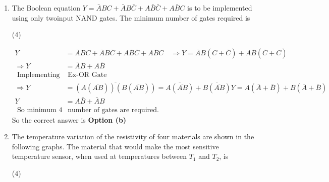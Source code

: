 \begin{enumerate}
If $Q_{1}, Q_{2}$ and $Q_{3}$ are set to zero initially, then the output after the arrival of the second falling clock (CLK) edge is
 \begin{tasks}(4)
\end{tasks}
\begin{answer}
	\begin{align*}
	\begin{array}{|ccc|c}
	\cline{1-3} Q_{3} & Q_{3} & Q_{1}& \\
	\cline{1-3} 0 & 0 & 1 &(1)\\
	\cline{1-3} 0 & 1 & 1 &(2)\\
	\cline{1-3}
	\end{array}
	\end{align*}
	So the correct answer is \textbf{Option (c)}
\end{answer}
\item The Boolean equation $Y=\bar{A} B C+\bar{A} B \bar{C}+A \bar{B} \bar{C}+A \bar{B} C$ is to be implemented using only twoinput NAND gates. The minimum number of gates required is
 \begin{tasks}(4)
\end{tasks}
\begin{answer}
	\begin{align*}
	Y&=\bar{A} B C+\bar{A} B \bar{C}+A \bar{B} \bar{C}+A \bar{B} C \quad \Rightarrow Y=\bar{A} B(C+\bar{C})+A \bar{B}(\bar{C}+C)\\
	\Rightarrow Y&=\bar{A} B+A \bar{B}\\
	\text { Implementing}&\text{ Ex-OR Gate }\\
	\Rightarrow Y&=\overline{(A(\overline{A B}))(B(\overline{A B}))}=\overline{A(\overline{A B})}+\overline{B(\overline{A B})} Y=A(\bar{A}+\bar{B})+B(\bar{A}+\bar{B}) \\
	Y&=A \bar{B}+\bar{A} B\\
	\text { So minimum } 4& \text { number of gates are required. }
	\end{align*}
		So the correct answer is \textbf{Option (b)}
\end{answer}
\item  The temperature variation of the resistivity of four materials are shown in the following graphs.	
The material that would make the most sensitive temperature sensor, when used at temperatures between $T_{1}$ and $T_{2}$, is
 \begin{tasks}(4)

\end{tasks}
\end{enumerate}
